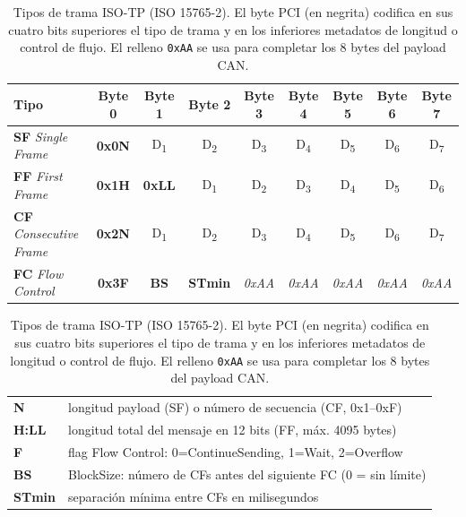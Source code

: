 
\begin{table}[!htbp]
\caption{Tipos de trama ISO-TP (ISO 15765-2). El byte PCI (en negrita) codifica en sus cuatro bits superiores el tipo de trama y en los inferiores metadatos de longitud o control de flujo. El relleno \texttt{0xAA} se usa para completar los 8 bytes del payload CAN.}
\label{tab:isotp_frames}
\centering
\renewcommand{\arraystretch}{1.4}
\begin{tabular}{|l|c|c|c|c|c|c|c|c|}
\hline
\textbf{Tipo} &
\textbf{Byte 0} & \textbf{Byte 1} & \textbf{Byte 2} & \textbf{Byte 3} &
\textbf{Byte 4} & \textbf{Byte 5} & \textbf{Byte 6} & \textbf{Byte 7} \\
\hline
\textbf{SF} \textit{Single Frame} &
\textbf{0x0N} & D\textsubscript{1} & D\textsubscript{2} & D\textsubscript{3} &
D\textsubscript{4} & D\textsubscript{5} & D\textsubscript{6} & D\textsubscript{7} \\
\hline
\textbf{FF} \textit{First Frame} &
\textbf{0x1H} & \textbf{0xLL} & D\textsubscript{1} & D\textsubscript{2} &
D\textsubscript{3} & D\textsubscript{4} & D\textsubscript{5} & D\textsubscript{6} \\
\hline
\textbf{CF} \textit{Consecutive Frame} &
\textbf{0x2N} & D\textsubscript{1} & D\textsubscript{2} & D\textsubscript{3} &
D\textsubscript{4} & D\textsubscript{5} & D\textsubscript{6} & D\textsubscript{7} \\
\hline
\textbf{FC} \textit{Flow Control} &
\textbf{0x3F} & \textbf{BS} & \textbf{STmin} & \textit{0xAA} &
\textit{0xAA} & \textit{0xAA} & \textit{0xAA} & \textit{0xAA} \\
\hline
\end{tabular}

\vspace{0.5em}
\begin{tabular}{ll}
\textbf{N} & longitud payload (SF) o número de secuencia (CF, 0x1--0xF) \\
\textbf{H:LL} & longitud total del mensaje en 12 bits (FF, máx. 4095 bytes) \\
\textbf{F} & flag Flow Control: 0=ContinueSending, 1=Wait, 2=Overflow \\
\textbf{BS} & BlockSize: número de CFs antes del siguiente FC (0 = sin límite) \\
\textbf{STmin} & separación mínima entre CFs en milisegundos \\
\end{tabular}
\end{table}
